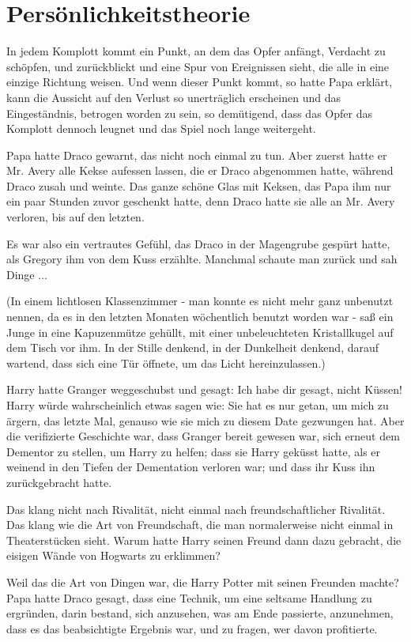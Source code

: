 \chapter{Persönlichkeitstheorie}

In jedem Komplott kommt ein Punkt, an dem das Opfer anfängt, Verdacht zu
schöpfen, und zurückblickt und eine Spur von Ereignissen sieht, die alle in eine
einzige Richtung weisen. Und wenn dieser Punkt kommt, so hatte Papa erklärt,
kann die Aussicht auf den Verlust so unerträglich erscheinen und das
Eingeständnis, betrogen worden zu sein, so demütigend, dass das Opfer das
Komplott dennoch leugnet und das Spiel noch lange weitergeht.

Papa hatte Draco gewarnt, das nicht noch einmal zu tun. Aber zuerst hatte er
Mr. Avery alle Kekse aufessen lassen, die er Draco abgenommen hatte, während
Draco zusah und weinte. Das ganze schöne Glas mit Keksen, das Papa ihm nur ein
paar Stunden zuvor geschenkt hatte, denn Draco hatte sie alle an Mr. Avery
verloren, bis auf den letzten.

Es war also ein vertrautes Gefühl, das Draco in der Magengrube gespürt hatte,
als Gregory ihm von dem Kuss erzählte. Manchmal schaute man zurück und sah
Dinge ...

(In einem lichtlosen Klassenzimmer - man konnte es nicht mehr ganz unbenutzt
nennen, da es in den letzten Monaten wöchentlich benutzt worden war - saß ein
Junge in eine Kapuzenmütze gehüllt, mit einer unbeleuchteten Kristallkugel auf
dem Tisch vor ihm. In der Stille denkend, in der Dunkelheit denkend, darauf
wartend, dass sich eine Tür öffnete, um das Licht hereinzulassen.)

Harry hatte Granger weggeschubst und gesagt: Ich habe dir gesagt, nicht Küssen!
Harry würde wahrscheinlich etwas sagen wie: Sie hat es nur getan, um mich zu
ärgern, das letzte Mal, genauso wie sie mich zu diesem Date gezwungen hat. Aber
die verifizierte Geschichte war, dass Granger bereit gewesen war, sich erneut
dem Dementor zu stellen, um Harry zu helfen; dass sie Harry geküsst hatte, als
er weinend in den Tiefen der Dementation verloren war; und dass ihr Kuss ihn
zurückgebracht hatte.

Das klang nicht nach Rivalität, nicht einmal nach freundschaftlicher Rivalität.
Das klang wie die Art von Freundschaft, die man normalerweise nicht einmal in
Theaterstücken sieht. Warum hatte Harry seinen Freund dann dazu gebracht, die
eisigen Wände von Hogwarts zu erklimmen?

Weil das die Art von Dingen war, die Harry Potter mit seinen Freunden machte?
Papa hatte Draco gesagt, dass eine Technik, um eine seltsame Handlung zu
ergründen, darin bestand, sich anzusehen, was am Ende passierte, anzunehmen,
dass es das beabsichtigte Ergebnis war, und zu fragen, wer davon profitierte.

